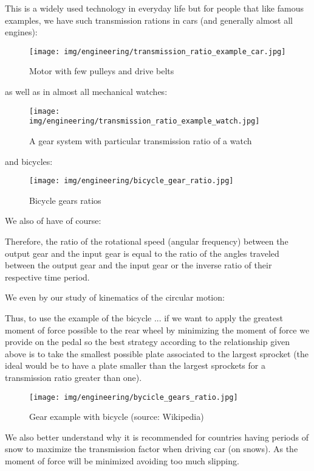	This is a widely used technology in everyday life but for people that like famous examples, we have such transmission rations in cars (and generally almost all engines):
	\begin{figure}[H]
		\begin{center}
			\texttt{[image: img/engineering/transmission\_ratio\_example\_car.jpg]}
		\end{center}	
		\caption{Motor with few pulleys and drive belts}
	\end{figure}
	as well as in almost all mechanical watches:
	\begin{figure}[H]
		\begin{center}
			\texttt{[image: img/engineering/transmission\_ratio\_example\_watch.jpg]}
		\end{center}	
		\caption{A gear system with particular transmission ratio of a watch}
	\end{figure}
	and bicycles:
	\begin{figure}[H]
		\begin{center}
			\texttt{[image: img/engineering/bicycle\_gear\_ratio.jpg]}
		\end{center}	
		\caption{Bicycle gears ratios}
	\end{figure}
	We also of have of course:
	
	Therefore, the ratio of the rotational speed (angular frequency) between the output gear and the input gear is equal to the ratio of the angles traveled between the output gear and the input gear or the inverse ratio of their respective time period.
	
	We even by our study of kinematics of the circular motion:
	
	
	Thus, to use the example of the bicycle ... if we want to apply the greatest moment of force possible to the rear wheel by minimizing the moment of force we provide on the pedal so the best strategy according to the relationship given above is to take the smallest possible plate associated to the largest sprocket (the ideal would be to have a plate smaller than the largest sprockets for a transmission ratio greater than one).
	\begin{figure}[H]
		\begin{center}
			\texttt{[image: img/engineering/bycicle\_gears\_ratio.jpg]}
		\end{center}	
		\caption[Gear example with bicycle]{Gear example with bicycle (source: Wikipedia)}
	\end{figure}
	We also better understand why it is recommended for countries having periods of snow to maximize the transmission factor when driving car (on snows). As the moment of force will be minimized avoiding too much slipping.
	

